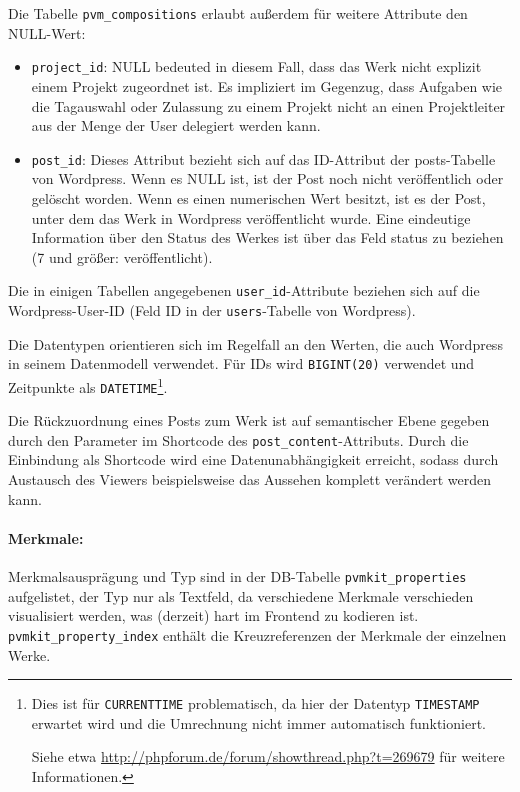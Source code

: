 \documentclass[a4paper,11pt]{article}
\begin{document}
Die Tabelle \texttt{pvm\_compositions} erlaubt außerdem für weitere Attribute
den NULL-Wert:
\begin{itemize}
\item \texttt{project\_id}: NULL bedeuted in diesem Fall, dass das Werk nicht
  explizit einem Projekt zugeordnet ist. Es impliziert im Gegenzug, dass
  Aufgaben wie die Tagauswahl oder Zulassung zu einem Projekt nicht an einen
  Projektleiter aus der Menge der User delegiert werden kann.
 
\item \texttt{post\_id}: Dieses Attribut bezieht sich auf das ID-Attribut der
  posts-Tabelle von Wordpress. Wenn es NULL ist, ist der Post noch nicht
  veröffentlich oder gelöscht worden. Wenn es einen numerischen Wert besitzt,
  ist es der Post, unter dem das Werk in Wordpress veröffentlicht wurde. Eine
  eindeutige Information über den Status des Werkes ist über das Feld status
  zu beziehen (7 und größer: veröffentlicht).
\end{itemize}
Die in einigen Tabellen angegebenen \texttt{user\_id}-Attribute beziehen sich
auf die Wordpress-User-ID (Feld ID in der \texttt{users}-Tabelle von
Wordpress).
 
Die Datentypen orientieren sich im Regelfall an den Werten, die auch Wordpress
in seinem Datenmodell verwendet. Für IDs wird \texttt{BIGINT(20)} verwendet
und Zeitpunkte als \texttt{DATETIME}\footnote{Dies ist für
  \texttt{CURRENTTIME} problematisch, da hier der Datentyp \texttt{TIMESTAMP}
  erwartet wird und die Umrechnung nicht immer automatisch funktioniert.\par 
  Siehe etwa \url{http://phpforum.de/forum/showthread.php?t=269679} für
  weitere Informationen.}.
 
Die Rückzuordnung eines Posts zum Werk ist auf semantischer Ebene gegeben
durch den Parameter im Shortcode des \texttt{post\_content}-Attributs. Durch
die Einbindung als Shortcode wird eine Datenunabhängigkeit erreicht, sodass
durch Austausch des Viewers beispielsweise das Aussehen komplett verändert
werden kann.

\paragraph{Merkmale:}
Merkmalsausprägung und Typ sind in der DB-Tabelle \texttt{pvmkit\_properties}
aufgelistet, der Typ nur als Textfeld, da verschiedene Merkmale verschieden
visualisiert werden, was (derzeit) hart im Frontend zu kodieren ist.
\texttt{pvmkit\_property\_index} enthält die Kreuzreferenzen der Merkmale der
einzelnen Werke.
 
\end{document}
